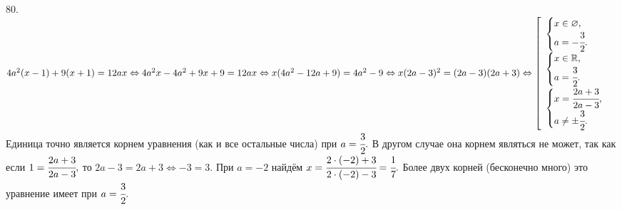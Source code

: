 80. $4a^2(x-1)+9(x+1)=12ax\Leftrightarrow 4a^2x-4a^2+9x+9=12ax\Leftrightarrow
x(4a^2-12a+9)=4a^2-9\Leftrightarrow x(2a-3)^2=(2a-3)(2a+3)\Leftrightarrow
\left[\begin{array}{l}\begin{cases} x\in\varnothing,\\ a=-\cfrac{3}{2}.\end{cases}\\
\begin{cases} x\in\mathbb{R},\\ a=\cfrac{3}{2}.\end{cases}\\\begin{cases} x=\cfrac{2a+3}{2a-3},\\ a\neq\pm\cfrac{3}{2}.\end{cases}\end{array}\right.$\\
Единица точно является корнем уравнения (как и все остальные числа) при $a=\cfrac{3}{2}.$ В другом случае она корнем являться не может, так как если $1=\cfrac{2a+3}{2a-3},$ то $2a-3=2a+3\Leftrightarrow -3=3.$ При $a=-2$ найдём $x=\cfrac{2\cdot(-2)+3}{2\cdot(-2)-3}=\cfrac{1}{7}.$ Более двух корней (бесконечно много) это уравнение имеет при $a=\cfrac{3}{2}.$\\
